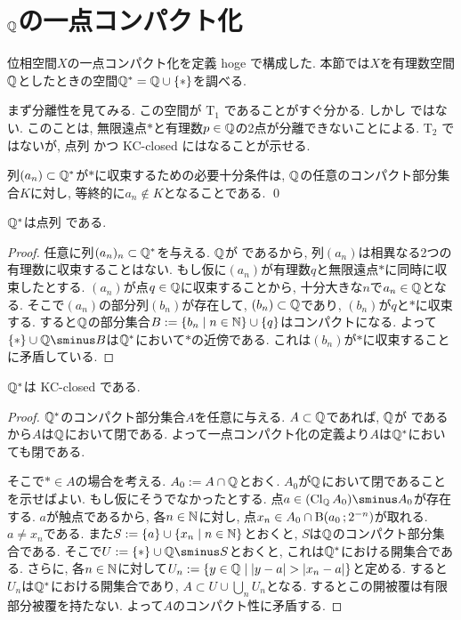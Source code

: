 \documentclass[uplatex, dvipdfmx, a4paper, 12pt]{jsarticle}
\theoremstyle{plain}
\theoremstyle{nonumberplain}
\newtheorem{proof}{証明}
\newcommand{\topT}[1]{\texorpdfstring{\ensuremath{\mathrm{T}_{#1}}}{T#1}}
\begin{document}
\section{$ \mathbb{Q} $の一点コンパクト化}
位相空間$ X $の一点コンパクト化を定義 hoge で構成した. 本節では$ X $を有理数空間$ \mathbb{Q} $としたときの空間$ \mathbb{Q}^\ast = \mathbb{Q} \cup \{\ast\} $を調べる.

まず分離性を見てみる. この空間が \topT{1} であることがすぐ分かる. しかし \Hausdorff ではない. このことは, 無限遠点$ \ast $と有理数$ p \in \mathbb{Q} $の2点が分離できないことによる. \topT{2} ではないが, 点列 \Hausdorff かつ KC-closed にはなることが示せる.

\begin{lemma}
	列$ (a_n) \subset \mathbb{Q}^\ast $が$ \ast $に収束するための必要十分条件は, $ \mathbb{Q} $の任意のコンパクト部分集合$ K $に対し, 等終的に$ a_n \not\in K $となることである. \qed
\end{lemma}

\begin{property}
	\label{property:Q^ast is seq.Haus}
	$ \mathbb{Q}^\ast $は点列 \Hausdorff である.
\end{property}

\begin{proof}
	任意に列$ (a_n)_n \subset \mathbb{Q}^\ast $を与える. $ \mathbb{Q} $が \Hausdorff であるから, 列$ (a_n) $は相異なる2つの有理数に収束することはない. もし仮に$ (a_n) $が有理数$ q $と無限遠点$ \ast $に同時に収束したとする. $ (a_n) $が点$ q \in \mathbb{Q} $に収束することから, 十分大きな$ n $で$ a_n \in \mathbb{Q} $となる. そこで$ (a_n) $の部分列$ (b_n) $が存在して, $ (b_n) \subset \mathbb{Q} $であり, $ (b_n) $が$ q $と$ \ast $に収束する. すると$ \mathbb{Q} $の部分集合$ B \defeq \setcomp{b_n}{n \in \N} \cup \{q\} $はコンパクトになる. よって$ \{\ast\} \cup \Q \sminus B $は$ \mathbb{Q}^\ast $において$ \ast $の近傍である. これは$ (b_n) $が$ \ast $に収束することに矛盾している.
\end{proof}

\begin{property}
	$ \mathbb{Q}^\ast $は KC-closed である.
\end{property}
\begin{proof}
	$ \mathbb{Q}^\ast $のコンパクト部分集合$ A $を任意に与える. $ A \subset \mathbb{Q} $であれば, $ \mathbb{Q} $が \Hausdorff であるから$ A $は$ \mathbb{Q} $において閉である. よって一点コンパクト化の定義より$ A $は$ \mathbb{Q}^\ast $においても閉である.

	そこで$ \ast \in A $の場合を考える. $ A_0 \mathrel{:=} A \cap \mathbb{Q} $とおく. $ A_0 $が$ \mathbb{Q} $において閉であることを示せばよい. もし仮にそうでなかったとする. 点$ a \in (\topcl_\Q A_0) \sminus A_0 $が存在する. $ a $が触点であるから, 各$ n \in \mathbb{N} $に対し, 点$ x_n \in A_0 \cap \topball{a_0}{2^{-n}} $が取れる. $ a \neq x_n  $である. また$ S \defeq \{a\} \cup \setcomp{x_n}{n \in \N} $とおくと, $ S $は$ \mathbb{Q} $のコンパクト部分集合である. そこで$ U \defeq \{\ast\} \cup \Q \sminus S  $とおくと, これは$ \mathbb{Q}^\ast $における開集合である. さらに, 各$ n \in \mathbb{N} $に対して$ U_n \defeq \setcomp{y \in \Q}{| y - a | > |x_n - a|} $と定める. すると$ U_n $は$ \mathbb{Q} ^\ast $における開集合であり, $ A \subset U \cup \bigcup_n U_n $となる. するとこの開被覆は有限部分被覆を持たない. よって$ A $のコンパクト性に矛盾する.
\end{proof}
\end{document}
